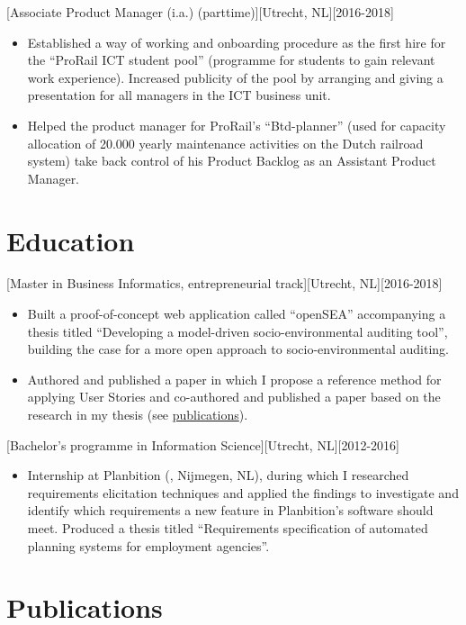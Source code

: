 \documentclass[10pt]{article}
\begin{document}
[Associate Product Manager (i.a.) (parttime)][Utrecht, NL][2016-2018]
\begin{itemize}
    \item Established a way of working and onboarding procedure as the first hire for the \enquote{ProRail ICT student pool} (programme for students to gain relevant work experience). Increased publicity of the pool by arranging and giving a presentation for all managers in the ICT business unit.
    \item Helped the product manager for ProRail's \enquote{Btd-planner} (used for capacity allocation of 20.000 yearly maintenance activities on the Dutch railroad system) take back control of his Product Backlog as an Assistant Product Manager.
\end{itemize}

\section{Education}
\label{sec:school}

[Master in Business Informatics, entrepreneurial track][Utrecht, NL][2016-2018]
\begin{itemize}
    \item Built a proof-of-concept web application called \enquote{openSEA} accompanying a thesis titled \enquote{Developing a model-driven socio-environmental auditing tool}, building the case for a more open approach to socio-environmental auditing.
    \item Authored and published a paper in which I propose a reference method for applying User Stories and co-authored and published a paper based on the research in my thesis (see \hyperref[sec:pubs]{publications}).
\end{itemize}

[Bachelor's programme in Information Science][Utrecht, NL][2012-2016]
\begin{itemize}
    \item Internship at Planbition (, Nijmegen, NL), during which I researched requirements elicitation techniques and applied the findings to investigate and identify which requirements a new feature in Planbition's software should meet. Produced a thesis titled \enquote{Requirements specification of automated planning systems for employment agencies}.
\end{itemize}

\section{Publications}
\label{sec:pubs}
\end{document}
